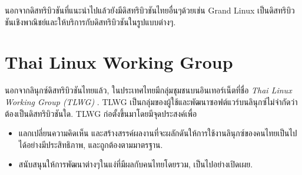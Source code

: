 \begin{thwbr}
{{นอกจากดิสทริบิวชันที่แนะนำไปแล้วยังมีดิสทริบิวชันไทยอื่นๆด้วยเช่น Grand Linux เป็นดิสทริบิวชันเชิงพาณิชย์และให้บริการกับดิสทริบิวชันในรูปแบบต่างๆ.


\section{Thai Linux Working Group}
นอกจากลินุกซ์ดิสทริบิวชันไทยแล้ว, ในประเทศไทยมีกลุ่มชุมชนบนอินเทอร์เน็ตที่ชื่อ \emph{Thai Linux Working Group (TLWG)} \cite{tlwg}. TLWG เป็นกลุ่มของผู้ใช้และพัฒนาซอฟต์แวร์บนลินุกซ์ไม่จำกัดว่าต้องเป็นดิสทริบิวชันใด. TLWG ก่อตั้งขึ้นมาโดยมีจุดประสงค์เพื่อ
\begin{itemize}
\item {}แลกเปลี่ยนความคิดเห็น และสร้างสรรค์ผลงานที่จะผลักดันให้การใช้งานลินุกซ์ของคนไทยเป็นไปได้อย่างมีประสิทธิภาพ, และถูกต้องตามมาตรฐาน.
\item สนับสนุนให้การพัฒนาต่างๆในแง่ที่มีผลกับคนไทยโดยรวม, เป็นไปอย่างเปิดเผย.
\end{itemize}

}}
\end{thwbr}
